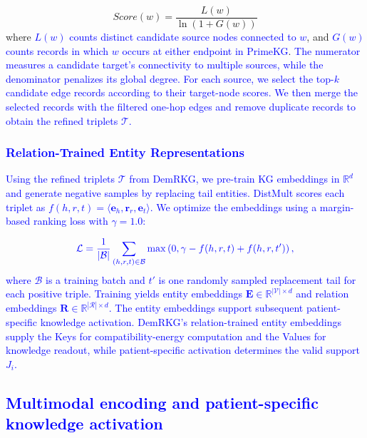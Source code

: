 \documentclass[lettersize,journal]{IEEEtran}
\begin{document}
    \begin{equation}
        Score(w) = \frac{L(w)}{\ln(1 + G(w))}
        \label{eq:spec-score}
    \end{equation}
    where \textcolor{blue}{$L(w)$ counts distinct candidate source nodes connected to $w$}, and \textcolor{blue}{$G(w)$ counts records in which $w$ occurs at either endpoint in PrimeKG}. \textcolor{blue}{The numerator measures a candidate target's connectivity to multiple sources, while the denominator penalizes its global degree. For each source, we select the top-$k$ candidate edge records according to their target-node scores. We then merge the selected records with the filtered one-hop edges and remove duplicate records to obtain the refined triplets $\mathcal{T}$.}

\subsubsection{\textcolor{blue}{Relation-Trained Entity Representations}}

    \textcolor{blue}{Using the refined triplets $\mathcal{T}$ from DemRKG, we pre-train KG embeddings in $\mathbb{R}^d$ and generate negative samples by replacing tail entities. DistMult scores each triplet as $f(h,r,t)=\langle\mathbf e_h,\mathbf r_r,\mathbf e_t\rangle$. We optimize the embeddings using a margin-based ranking loss with $\gamma=1.0$:}

    \begin{equation}
        {\color{blue}
        \mathcal{L} = \frac{1}{|\mathcal{B}|}\sum_{(h,r,t)\in\mathcal{B}}
        \max\left(0,\gamma-f(h,r,t)+f(h,r,t')\right),
        }
        \label{eq:margin_loss}
    \end{equation}
    \textcolor{blue}{where $\mathcal{B}$ is a training batch and $t'$ is one randomly sampled replacement tail for each positive triple.}
    \textcolor{blue}{Training yields entity embeddings $\mathbf{E} \in \mathbb{R}^{|\mathcal{V}| \times d}$ and relation embeddings $\mathbf{R} \in \mathbb{R}^{|\mathcal{R}| \times d}$. The entity embeddings support subsequent patient-specific knowledge activation.}
    \textcolor{blue}{DemRKG's relation-trained entity embeddings supply the Keys for compatibility-energy computation and the Values for knowledge readout, while patient-specific activation determines the valid support $J_i$.}


\subsection{\textcolor{blue}{Multimodal encoding and patient-specific knowledge activation}}
\end{document}
